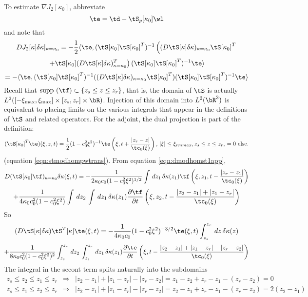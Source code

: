 To estimate $\nabla J_2[\kappa_0]$, abbreviate
\[
  \te=\td -
  \tS_p[\kappa_0]\wl 
\]
and note that
\[
  DJ_2[\kappa]\delta \kappa|_{\kappa=\kappa_0} = -
  \frac{1}{2}\langle \te,
  (\tS[\kappa_0]\tS[\kappa_0]^T)^{-1}\left((D\tS[\kappa]\delta
  \kappa)_{\kappa=\kappa_0}\tS[\kappa_0]^T\right.
\]
\[
  \left.+\tS[\kappa_0](D\tS[\kappa]\delta
  \kappa)_{\kappa=\kappa_0}^T\right) (\tS[\kappa_0]\tS[\kappa_0]^T)^{-1} \te\rangle
\]
\begin{equation}
  \label{eqn:dj2}
 = -\langle \te,(\tS[\kappa_0]\tS[\kappa_0]^T)^{-1}
  ((D\tS[\kappa]\delta
  \kappa)_{\kappa=\kappa_0}\tS[\kappa_0]^T)
  (\tS[\kappa_0]\tS[\kappa_0]^T)^{-1}\te\rangle
\end{equation}
Recall that $\mbox{supp }(\tf) \subset \{z_s \le z \le
z_r\}$, that is, the domain of $\tS$ is actually
$L^2([-\xi_{\rm max},\xi_{\rm max}] \times [z_s,z_r] \times
\bR)$. Injection of this domain into $L^2(\bR^3)$ is equivalent to
placing limits on the various integrals that appear in the definitions
of $\tS$ and related operators. For the adjoint, the dual projection
is part of the definition:
\begin{equation}
  (\tS[\kappa_0]^T\te)(\xi,z,t)=\frac{1}{2}(1-c_0^2\xi^2)^{-1}\te\left(\xi,t +
    \frac{|z_r-z|}{\tc_0(\xi)}\right), \,|\xi|\le \xi_{rm max}, z_s
  \le z \le z_r, \, =0 \mbox{ else}.
\end{equation}
(equation \ref{eqn:stmodhompwtrans}). From equation \ref{eqn:dmodhomst1app},
\[
  D(\tS[\kappa_0]\tf)_{\kappa=\kappa_0}\delta \kappa(\xi,t) =
  -\frac{1}{2\kappa_0c_0(1-c_0^2\xi^2)^{1/2}}\int \,dz_1\, \delta 
  \kappa(z_1) \tf \left(\xi,z_1,t - \frac{|z_r-z_1|}{\tc_0(\xi)}\right)
\]
\[
    + \frac{1}{4\kappa_0c_0^2(1-c_0^2\xi^2)} \int\,dz_2 \, \int \,dz_1\,\delta 
  \kappa(z_1)  \frac{\partial \tf}{\partial
    t}\left(\xi,z_2,t - \frac{|z_2-z_1|+|z_1-z_r|}{\tc_0(\xi)}\right)
\]
So
\[
 ( D\tS[\kappa]\delta \kappa) \tS^T[\kappa]\te(\xi,t) =
  -\frac{1}{4\kappa_0c_0}(1-c_0^2\xi^2)^{-3/2} \te(\xi,t)
  \int_{z_s}^{z_r}\,dz\,\delta \kappa (z)
\]
\begin{equation}
  \label{eqn:dmodhompwst2}
     + \frac{1}{8\kappa_0c_0^2(1-c_0^2\xi^2)^2} \int_{z_s}^{z_r}\,dz_2 \, \int_{z_s}^{z_r} \,dz_1\,\delta 
  \kappa(z_1)  \frac{\partial \te}{\partial
    t}\left(\xi,t - \frac{|z_2-z_1|+|z_1-z_r|-|z_r-z_2|}{\tc_0(\xi)}\right)
\end{equation}
The integral in the secont term splits naturally into the subdomains
\begin{eqnarray*}
 z_s \le z_2 \le z_1 \le z_r & \Rightarrow &
                                            |z_2-z_1|+|z_1-z_r|-|z_r-z_2|
                                            = z_1-z_2 + z_r-z_1 -
                                           ( z_r-z_2) = 0\\
z_s \le z_1 \le z_2\le z_r  & \Rightarrow
                                          &|z_2-z_1|+|z_1-z_r|-|z_r-z_2|
                                            = z_2-z_1 + z_r-z_1 -
                                            (z_r-z_2) = 2(z_2-z_1)
\end{eqnarray*}
